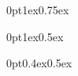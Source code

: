 \usepackage{titlesec}

\pagestyle{empty}

\titlespacing*{\section}
{0pt}{1ex}{0.75ex}

\titlespacing*{\subsection}
{0pt}{1ex}{0.5ex}

\titlespacing*{\subsubsection}
{0pt}{0.4ex}{0.5ex}

\setlength{\parskip}{0.25em}
\setlength{\parindent}{0pt}

\usepackage{enumitem}

\setlength{\parskip}{0.25em}

\usepackage{float}

\makeatletter
\def\fps@figure{H}
\makeatother